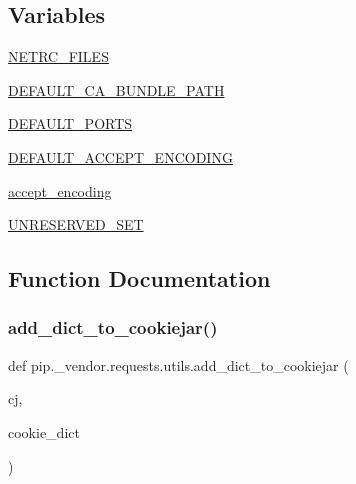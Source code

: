\subsection*{Variables}
\begin{DoxyCompactItemize}
\item 
\hyperlink{namespacepip_1_1__vendor_1_1requests_1_1utils_a39e7e13ec09df9bcc7d4ff12cc22e799}{N\+E\+T\+R\+C\+\_\+\+F\+I\+L\+ES}
\item 
\hyperlink{namespacepip_1_1__vendor_1_1requests_1_1utils_a90083bae612556808bc467d2f9281b3e}{D\+E\+F\+A\+U\+L\+T\+\_\+\+C\+A\+\_\+\+B\+U\+N\+D\+L\+E\+\_\+\+P\+A\+TH}
\item 
\hyperlink{namespacepip_1_1__vendor_1_1requests_1_1utils_a9a09b24faf916a0e579b924d1b9b2a15}{D\+E\+F\+A\+U\+L\+T\+\_\+\+P\+O\+R\+TS}
\item 
\hyperlink{namespacepip_1_1__vendor_1_1requests_1_1utils_af3eabdad66802639b3796102c43a9e5f}{D\+E\+F\+A\+U\+L\+T\+\_\+\+A\+C\+C\+E\+P\+T\+\_\+\+E\+N\+C\+O\+D\+I\+NG}
\item 
\hyperlink{namespacepip_1_1__vendor_1_1requests_1_1utils_a787783e06cd91e8a4321a86bf96cc215}{accept\+\_\+encoding}
\item 
\hyperlink{namespacepip_1_1__vendor_1_1requests_1_1utils_a9efd52995ea17b4eb8e2e2ae90f5eab1}{U\+N\+R\+E\+S\+E\+R\+V\+E\+D\+\_\+\+S\+ET}
\end{DoxyCompactItemize}


\subsection{Function Documentation}
\mbox{\label{namespacepip_1_1__vendor_1_1requests_1_1utils_a143c04ce30975c09b175088019035604}} 
\subsubsection{\texorpdfstring{add\+\_\+dict\+\_\+to\+\_\+cookiejar()}{add\_dict\_to\_cookiejar()}}
{\footnotesize\ttfamily def pip.\+\_\+vendor.\+requests.\+utils.\+add\+\_\+dict\+\_\+to\+\_\+cookiejar (\begin{DoxyParamCaption}\item[{}]{cj,  }\item[{}]{cookie\+\_\+dict }\end{DoxyParamCaption})}

